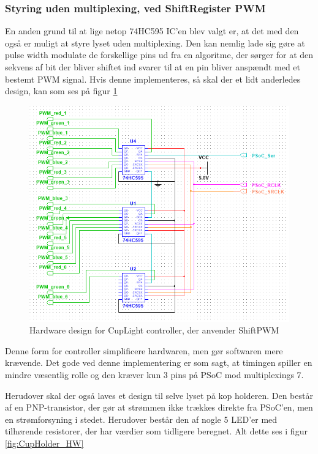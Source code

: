 \documentclass[HardwareDesign/HardwareDesign_main.tex]{subfiles}
\begin{document}
\subsubsection{Styring uden multiplexing, ved ShiftRegister PWM}
En anden grund til at lige netop 74HC595 IC'en blev valgt er, at det med den også er muligt at styre lyset uden multiplexing. Den kan nemlig lade sig gøre at pulse width modulate de forskellige pins ud fra en algoritme, der sørger for at den sekvens af bit der bliver shiftet ind svarer til at en pin bliver anspændt med et bestemt PWM signal. Hvis denne implementeres, så skal der et lidt anderledes design, kan som ses på figur \ref{fig:CupLight_HW_ShiftPWM}
\begin{figure}[H]
    \centering
    \includegraphics[width=\textwidth]{HardwareDesign/CupLight/graphics/CupLight_HW_Controller.png}
    \caption{Hardware design for CupLight controller, der anvender ShiftPWM}
    \label{fig:CupLight_HW_ShiftPWM}
\end{figure}

Denne form for controller simplificere  hardwaren, men gør softwaren mere krævende. Det gode ved denne implementering er som sagt, at timingen spiller en mindre væsentlig rolle og den kræver kun 3 pins på PSoC mod multiplexings 7.

Herudover skal der også laves et design til selve lyset på kop holderen. Den består af en PNP-transistor, der gør at strømmen ikke trækkes direkte fra PSoC'en, men en strømforsyning i stedet. Herudover består den af nogle 5 LED'er med tilhørende resistorer, der har værdier som tidligere beregnet. Alt dette ses i figur \ref{fig:CupHolder_HW}
\end{document}
